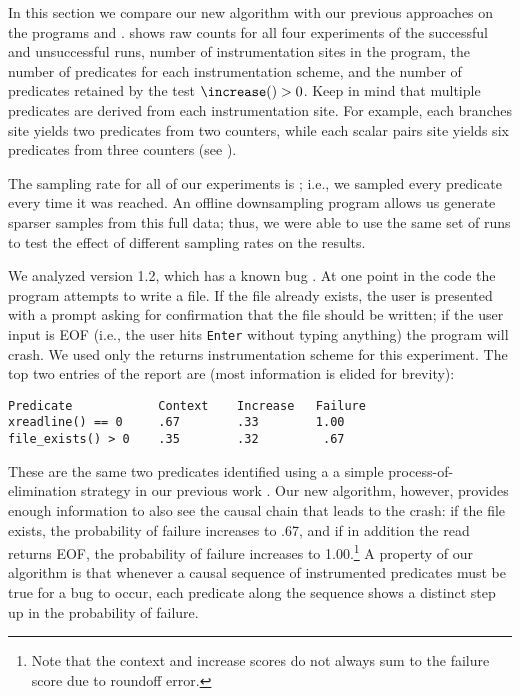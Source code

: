 


In this section we compare our new algorithm with our previous
approaches on the programs \ccrypt and \bc.
 shows raw counts for all four experiments of the
successful and unsuccessful runs, number of instrumentation sites in
the program, the number of predicates for each
instrumentation scheme, and the number of predicates retained by the
test $\increase() > 0$.   Keep in mind that multiple predicates are
derived from each instrumentation site.  For example, each branches
site yields two predicates from two counters, while each scalar pairs
site yields six predicates from three counters (see ).

The sampling rate for all of our experiments is ;
i.e., we sampled every predicate every time it was reached.  An
offline downsampling program allows us generate sparser samples from this
full data; thus, we were able to use the same set of runs to test the
effect of different sampling rates on the results.  

We analyzed \ccrypt version 1.2, which has a known bug \cite{Selinger:2003:cqual}.  At one point in the code the program attempts to write a file.  If the file already exists, the user is presented with a prompt asking for confirmation that the file should be written; if the user input is EOF (i.e., the user hits {\tt Enter} without typing anything) the program will crash.  We used only the returns
instrumentation scheme for this experiment. The top
two entries of the report are (most information is elided for
brevity):
\begin{verbatim}
Predicate            Context    Increase   Failure
xreadline() == 0     .67        .33        1.00
file_exists() > 0    .35        .32         .67
\end{verbatim}

These are the same two predicates identified using a a simple process-of-elimination strategy in our previous work
\cite{PLDI`03*141}.  Our new algorithm, however, provides enough information to also see the causal chain that
leads to the crash: if the file exists, the probability of failure increases to .67, and if in addition the
read returns EOF, the probability of failure increases to 1.00.\footnote{Note that the context and increase scores do not always sum to the failure score due to roundoff error.}   A property of our algorithm is that 
whenever a causal sequence of instrumented predicates must be true for a bug to occur, each predicate along the
sequence shows a distinct step up in the probability of failure.

